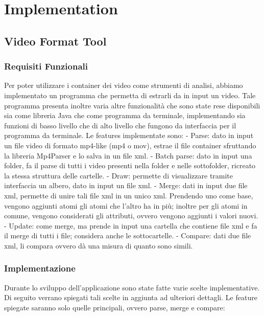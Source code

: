 \chapter{Implementation}

\section{Video Format Tool}

\subsection{Requisiti Funzionali}
 
Per poter utilizzare i container dei video come strumenti di analisi, abbiamo implementato un programma che permetta di estrarli da in input un video.
Tale programma presenta inoltre varia altre funzionalità che sono state rese disponibili sia come libreria Java che come programma da terminale, implementando sia funzioni di basso livello che di alto livello che fungono da interfaccia per il programma da terminale.
Le features implementate sono:
- Parse: dato in input un file video di formato mp4-like (mp4 o mov), estrae il file container sfruttando la libreria Mp4Parser e lo salva in un file xml.
- Batch parse: dato in input una folder, fa il parse di tutti i video presenti nella folder e nelle sottofolder, ricreato la stessa struttura delle cartelle.
- Draw: permette di visualizzare tramite interfaccia un albero, dato in input un file xml.
- Merge: dati in input due file xml, permette di unire tali file xml in un unico xml. Prendendo uno come base, vengono aggiunti atomi gli atomi che l'altro ha in più; inoltre per gli atomi in comune, vengono considerati gli attributi, ovvero vengono aggiunti i valori nuovi.
- Update: come merge, ma prende in input una cartella che contiene file xml e fa il merge di tutti i file; considera anche le sottocartelle.
- Compare: dati due file xml, li compara ovvero dà una misura di quanto sono simili.


\subsection{Implementazione}

Durante lo sviluppo dell'applicazione sono state fatte varie scelte implementative. Di seguito verrano spiegati tali scelte in aggiunta ad ulteriori dettagli. Le feature spiegate saranno solo quelle principali, ovvero parse, merge e compare:

